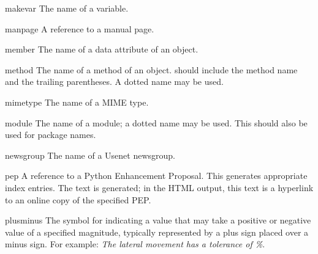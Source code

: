 \documentclass{howto}
\begin{document}
    \begin{macrodesc}{makevar}{}
      The name of a  variable.
    \end{macrodesc}

    \begin{macrodesc}{manpage}{}
      A reference to a \UNIX{} manual page.
    \end{macrodesc}

    \begin{macrodesc}{member}{}
      The name of a data attribute of an object.
    \end{macrodesc}

    \begin{macrodesc}{method}{}
      The name of a method of an object.   should include the
      method name and the trailing parentheses.  A dotted name may be
      used.
    \end{macrodesc}

    \begin{macrodesc}{mimetype}{}
      The name of a MIME type.
    \end{macrodesc}

    \begin{macrodesc}{module}{}
       The name of a module; a dotted name may be used.  This should
       also be used for package names.
    \end{macrodesc}

    \begin{macrodesc}{newsgroup}{}
      The name of a Usenet newsgroup.
    \end{macrodesc}

    \begin{macrodesc}{pep}{}
      A reference to a Python Enhancement Proposal.  This generates
      appropriate index entries.  The text  is
      generated; in the HTML output, this text is a hyperlink to an
      online copy of the specified PEP.
    \end{macrodesc}

    \begin{macrodesc}{plusminus}{}
      The symbol for indicating a value that may take a positive or
      negative value of a specified magnitude, typically represented
      by a plus sign placed over a minus sign.  For example:
      \emph{The lateral movement has a tolerance of \%{}}.
    \end{macrodesc}
\end{document}
